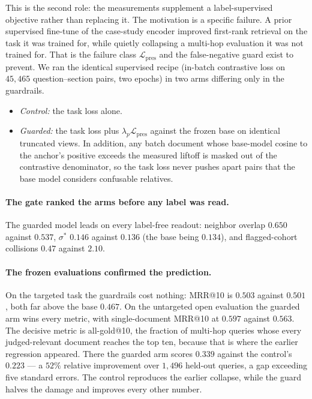 \documentclass[11pt,letterpaper]{article}
\newcommand{\sstar}{\sigma^{*}}
\begin{document}
This is the second role: the measurements supplement a label-supervised
objective rather than replacing it. The motivation is a specific failure.
A prior supervised fine-tune of the case-study encoder improved first-rank
retrieval on the task it was trained for, while quietly collapsing a
multi-hop evaluation it was not trained for. That is the failure class
$\mathcal L_{\mathrm{pres}}$ and the false-negative guard exist to
prevent. We ran the identical supervised recipe (in-batch contrastive loss
on $45{,}465$ question--section pairs, two epochs) in two arms differing
only in the guardrails.
\begin{itemize}
\item \emph{Control:} the task loss alone.
\item \emph{Guarded:} the task loss plus $\lambda_p \mathcal
  L_{\mathrm{pres}}$ against the frozen base on identical truncated
  views. In addition, any batch document whose base-model cosine to the
  anchor's positive exceeds the measured liftoff is masked out of the
  contrastive denominator, so the task loss never pushes apart pairs
  that the base model considers confusable relatives.
\end{itemize}

\paragraph{The gate ranked the arms before any label was read.}
The guarded model leads on every label-free readout: neighbor overlap
$0.650$ against $0.537$, $\sstar$ $0.146$ against $0.136$ (the base being
$0.134$), and flagged-cohort collisions $0.47$ against $2.10$.

\paragraph{The frozen evaluations confirmed the prediction.}
On the targeted task the guardrails cost nothing: MRR@10 is $0.503$
against $0.501$, both far above the base $0.467$. On the untargeted open
evaluation the guarded arm wins every metric, with single-document MRR@10
at $0.597$ against $0.563$. The decisive metric is all-gold@10, the
fraction of multi-hop queries whose every judged-relevant document reaches
the top ten, because that is where the earlier regression appeared. There
the guarded arm scores $0.339$ against the control's $0.223$ --- a $52\%$
relative improvement over $1{,}496$ held-out queries, a gap exceeding five
standard errors. The control reproduces the earlier collapse, while the
guard halves the damage and improves every other number.
\end{document}
